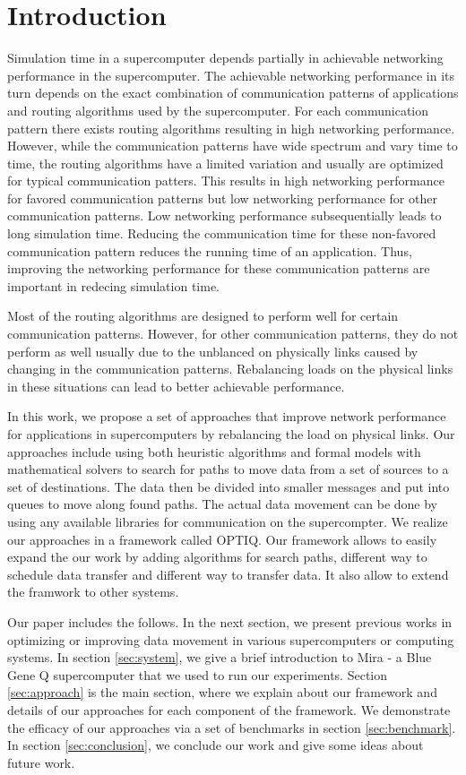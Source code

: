 \section{Introduction}
\label{sec:intro}
Simulation time in a supercomputer depends partially in achievable networking performance in the supercomputer. The achievable networking performance in its turn depends on the exact combination of communication patterns of applications and routing algorithms used by the supercomputer. For each communication pattern there exists routing algorithms resulting in high networking performance. However, while the communication patterns have wide spectrum and vary time to time, the routing algorithms have a limited variation and usually are optimized for typical communication patters. This results in high networking performance for favored communication patterns but low networking performance for other communication patterns. Low networking performance subsequentially leads to long simulation time. Reducing the communication time for these non-favored communication pattern reduces the running time of an application. Thus, improving the networking performance for these communication patterns are important in redecing simulation time. 

Most of the routing algorithms are designed to perform well for certain communication patterns. However, for other communication patterns, they do not perform as well usually due to the unblanced on physically links caused by changing in the communication patterns. Rebalancing loads on the physical links in these situations can lead to better achievable performance. 

In this work, we propose a set of approaches that improve network performance for applications in supercomputers by rebalancing the load on physical links. Our approaches include using both heuristic algorithms and formal models with mathematical solvers to search for paths to move data from a set of sources to a set of destinations. The data then be divided into smaller messages and put into queues to move along found paths. The actual data movement can be done by using any available libraries for communication on the supercompter. We realize our approaches in a framework called OPTIQ. Our framework allows to easily expand the our work by adding algorithms for search paths, different way to schedule data transfer and different way to transfer data. It also allow to extend the framwork to other systems.

Our paper includes the follows. In the next section, we present previous works in optimizing or improving data movement in various supercomputers or computing systems. In section \ref{sec:system}, we give a brief introduction to Mira - a Blue Gene Q supercomputer that we used to run our experiments. Section \ref{sec:approach} is the main section, where we explain about our framework and details of our approaches for each component of the framework. We demonstrate the efficacy of our approaches via a set of benchmarks in section \ref{sec:benchmark}. In section \ref{sec:conclusion}, we conclude our work and give some ideas about future work.
